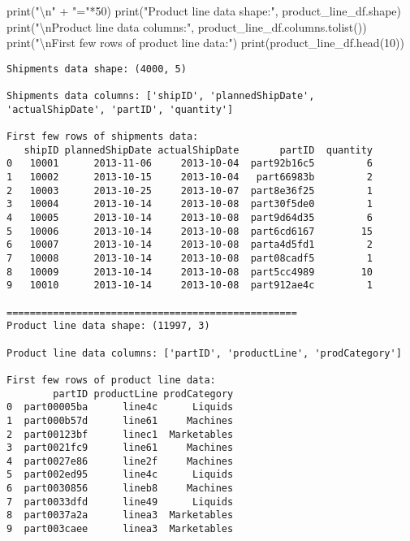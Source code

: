 \documentclass[
  letterpaper,
  DIV=11,
  numbers=noendperiod]{scrartcl}
\newenvironment{Shaded}{\begin{snugshade}}{\end{snugshade}}
\newcommand{\BuiltInTok}[1]{\textcolor[rgb]{0.00,0.23,0.31}{#1}}
\newcommand{\CharTok}[1]{\textcolor[rgb]{0.13,0.47,0.30}{#1}}
\newcommand{\DecValTok}[1]{\textcolor[rgb]{0.68,0.00,0.00}{#1}}
\newcommand{\NormalTok}[1]{\textcolor[rgb]{0.00,0.23,0.31}{#1}}
\newcommand{\OperatorTok}[1]{\textcolor[rgb]{0.37,0.37,0.37}{#1}}
\newcommand{\StringTok}[1]{\textcolor[rgb]{0.13,0.47,0.30}{#1}}
\begin{document}
\begin{Shaded}
\begin{Highlighting}[]
\BuiltInTok{print}\NormalTok{(}\StringTok{"}\CharTok{\textbackslash{}n}\StringTok{"} \OperatorTok{+} \StringTok{"="}\OperatorTok{*}\DecValTok{50}\NormalTok{)}
\BuiltInTok{print}\NormalTok{(}\StringTok{"Product line data shape:"}\NormalTok{, product\_line\_df.shape)}
\BuiltInTok{print}\NormalTok{(}\StringTok{"}\CharTok{\textbackslash{}n}\StringTok{Product line data columns:"}\NormalTok{, product\_line\_df.columns.tolist())}
\BuiltInTok{print}\NormalTok{(}\StringTok{"}\CharTok{\textbackslash{}n}\StringTok{First few rows of product line data:"}\NormalTok{)}
\BuiltInTok{print}\NormalTok{(product\_line\_df.head(}\DecValTok{10}\NormalTok{))}
\end{Highlighting}
\end{Shaded}

\begin{verbatim}
Shipments data shape: (4000, 5)

Shipments data columns: ['shipID', 'plannedShipDate', 'actualShipDate', 'partID', 'quantity']

First few rows of shipments data:
   shipID plannedShipDate actualShipDate       partID  quantity
0   10001      2013-11-06     2013-10-04  part92b16c5         6
1   10002      2013-10-15     2013-10-04   part66983b         2
2   10003      2013-10-25     2013-10-07  part8e36f25         1
3   10004      2013-10-14     2013-10-08  part30f5de0         1
4   10005      2013-10-14     2013-10-08  part9d64d35         6
5   10006      2013-10-14     2013-10-08  part6cd6167        15
6   10007      2013-10-14     2013-10-08  parta4d5fd1         2
7   10008      2013-10-14     2013-10-08  part08cadf5         1
8   10009      2013-10-14     2013-10-08  part5cc4989        10
9   10010      2013-10-14     2013-10-08  part912ae4c         1

==================================================
Product line data shape: (11997, 3)

Product line data columns: ['partID', 'productLine', 'prodCategory']

First few rows of product line data:
        partID productLine prodCategory
0  part00005ba      line4c      Liquids
1  part000b57d      line61     Machines
2  part00123bf      linec1  Marketables
3  part0021fc9      line61     Machines
4  part0027e86      line2f     Machines
5  part002ed95      line4c      Liquids
6  part0030856      lineb8     Machines
7  part0033dfd      line49      Liquids
8  part0037a2a      linea3  Marketables
9  part003caee      linea3  Marketables
\end{verbatim}
\end{document}
